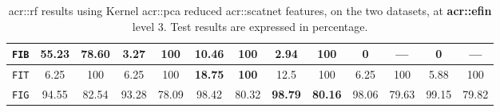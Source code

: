 \begin{sidewaystable}[htpb]
\begin{tabular}{| c | c c | c c | c c | c c | c c | c c |}
                    \hline
                    \texttt{FIB} & \textbf{55.23} & \textbf{78.60} & 3.27 & 100 & 10.46 & 100 & 2.94 & 100 & 0 & --- & 0 & --- \\
                    \hline
                    \texttt{FIT} & 6.25 & 100 & 6.25 & 100 & \textbf{18.75} & \textbf{100} & 12.5 & 100 & 6.25 & 100 & 5.88 & 100 \\
                    \hline
                    \texttt{FIG} & 94.55 & 82.54 & 93.28 & 78.09 & 98.42 & 80.32 & \textbf{98.79} & \textbf{80.16} & 98.06 & 79.63 & 99.15 & 79.82 \\
                    \hline
                \end{tabular}
                \caption{
                    \label{tab::stats_scat_kpca_rf_f3}
                    \gls{acr::rf} results using Kernel \gls{acr::pca} reduced \gls{acr::scatnet} features, on the two datasets, at \textbf{\gls{acr::efin}} level 3.
                    Test results are expressed in percentage.
                }
            \end{sidewaystable}

